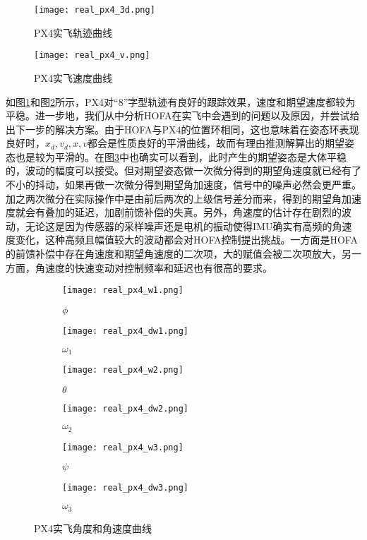 \begin{figure}[!h]
  \centering
    \texttt{[image: real\_px4\_3d.png]}
    \caption{PX4实飞轨迹曲线}
    \label{real_px4_3d}
  \end{figure}
  \begin{figure}[!h]
    \centering
      \texttt{[image: real\_px4\_v.png]}
      \caption{PX4实飞速度曲线}
      \label{real_px4_v}

\end{figure}



如图\ref{real_px4_3d}和图\ref{real_px4_v}所示，PX4对“8”字型轨迹有良好的跟踪效果，速度和期望速度都较为平稳。进一步地，我们从中分析HOFA在实飞中会遇到的问题以及原因，并尝试给出下一步的解决方案。由于HOFA与PX4的位置环相同，这也意味着在姿态环表现良好时，$x_d,v_d,x,v$都会是性质良好的平滑曲线，故而有理由推测解算出的期望姿态也是较为平滑的。在图\ref{real_px4_wdw}中也确实可以看到，此时产生的期望姿态是大体平稳的，波动的幅度可以接受。但对期望姿态做一次微分得到的期望角速度就已经有了不小的抖动，如果再做一次微分得到期望角加速度，信号中的噪声必然会更严重。加之两次微分在实际操作中是由前后两次的上级信号差分而来，得到的期望角加速度就会有叠加的延迟，加剧前馈补偿的失真。另外，角速度的估计存在剧烈的波动，无论这是因为传感器的采样噪声还是电机的振动使得IMU确实有高频的角速度变化，这种高频且幅值较大的波动都会对HOFA控制提出挑战。一方面是HOFA的前馈补偿中存在角速度和期望角速度的二次项，大的赋值会被二次项放大，另一方面，角速度的快速变动对控制频率和延迟也有很高的要求。


\begin{figure}[!h]
  \centering
  \begin{subfigure}[b]{0.49\textwidth}
      \centering
      \texttt{[image: real\_px4\_w1.png]}
      \caption{$\phi$}
  \end{subfigure}
  \hfill
  \begin{subfigure}[b]{0.49\textwidth}
      \centering
      \texttt{[image: real\_px4\_dw1.png]}
      \caption{$\omega_1$}
  \end{subfigure}
  
  \begin{subfigure}[b]{0.49\textwidth}
      \centering
      \texttt{[image: real\_px4\_w2.png]}
      \caption{$\theta$}
  \end{subfigure}
  \hfill
  \begin{subfigure}[b]{0.49\textwidth}
      \centering
      \texttt{[image: real\_px4\_dw2.png]}
      \caption{$\omega_2$}
  \end{subfigure}
  
  \begin{subfigure}[b]{0.49\textwidth}
      \centering
      \texttt{[image: real\_px4\_w3.png]}
      \caption{$\psi$}
  \end{subfigure}
  \hfill
  \begin{subfigure}[b]{0.49\textwidth}
      \centering
      \texttt{[image: real\_px4\_dw3.png]}
      \caption{$\omega_3$}
  \end{subfigure}
  \caption{PX4实飞角度和角速度曲线}
  \label{real_px4_wdw}
\end{figure}

